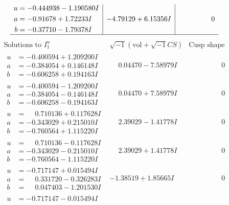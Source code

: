 \documentclass[1p]{elsarticle_modified}
\theoremstyle{definition}
\newcommand{\I}{\sqrt{-1}}
\begin{document}
$$\begin{array}{c|c|c}
\begin{aligned}
u &= -0.444938 - 1.190580 I \\
a &= -0.91678 + 1.72233 I \\
b &= -0.37710 - 1.79378 I\end{aligned}
 & -4.79129 + 6.15356 I & \phantom{-0.000000 } 0\\
 \hline 
 \end{array}$$\newpage$$\begin{array}{c|c|c}  
\text{Solutions to }I^u_{1}& \I (\text{vol} + \sqrt{-1}CS) & \text{Cusp shape}\\
 \hline 
\begin{aligned}
u &= -0.400594 + 1.209200 I \\
a &= -0.384054 + 0.146148 I \\
b &= -0.606258 + 0.194163 I\end{aligned}
 & \phantom{-}0.04470 - 7.58979 I & \phantom{-0.000000 } 0 \\ \hline\begin{aligned}
u &= -0.400594 - 1.209200 I \\
a &= -0.384054 - 0.146148 I \\
b &= -0.606258 - 0.194163 I\end{aligned}
 & \phantom{-}0.04470 + 7.58979 I & \phantom{-0.000000 } 0 \\ \hline\begin{aligned}
u &= \phantom{-}0.710136 + 0.117628 I \\
a &= -0.343029 + 0.215010 I \\
b &= -0.760564 + 1.115220 I\end{aligned}
 & \phantom{-}2.39029 - 1.41778 I & \phantom{-0.000000 } 0 \\ \hline\begin{aligned}
u &= \phantom{-}0.710136 - 0.117628 I \\
a &= -0.343029 - 0.215010 I \\
b &= -0.760564 - 1.115220 I\end{aligned}
 & \phantom{-}2.39029 + 1.41778 I & \phantom{-0.000000 } 0 \\ \hline\begin{aligned}
u &= -0.717147 + 0.015494 I \\
a &= \phantom{-}0.331720 - 0.326283 I \\
b &= \phantom{-}0.047403 - 1.201530 I\end{aligned}
 & -1.38519 + 1.85665 I & \phantom{-0.000000 } 0 \\ \hline\begin{aligned}
u &= -0.717147 - 0.015494 I \\

\end{aligned}
\end{array}$$
\end{document}
